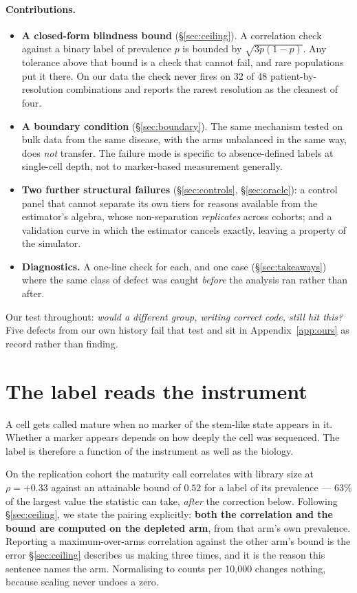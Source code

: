 \documentclass{article}
\begin{document}
\paragraph{Contributions.}
\begin{itemize}
\item \textbf{A closed-form blindness bound} (\S\ref{sec:ceiling}). A correlation
  check against a binary label of prevalence $p$ is bounded by
  $\sqrt{3p(1-p)}$. Any tolerance above that bound is a check that cannot fail,
  and rare populations put it there. On our data the check never fires on 32 of
  48 patient-by-resolution combinations and reports the rarest resolution as the
  cleanest of four.
\item \textbf{A boundary condition} (\S\ref{sec:boundary}). The same mechanism
  tested on bulk data from the same disease, with the arms unbalanced in the same
  way, does \emph{not} transfer. The failure mode is specific to absence-defined
  labels at single-cell depth, not to marker-based measurement generally.
\item \textbf{Two further structural failures} (\S\ref{sec:controls},
  \S\ref{sec:oracle}): a control panel that cannot separate its own tiers for
  reasons available from the estimator's algebra, whose non-separation
  \emph{replicates} across cohorts; and a validation curve in which the estimator
  cancels exactly, leaving a property of the simulator.
\item \textbf{Diagnostics.} A one-line check for each, and one case
  (\S\ref{sec:takeaways}) where the same class of defect was caught
  \emph{before} the analysis ran rather than after.
\end{itemize}

Our test throughout: \emph{would a different group, writing correct code, still
hit this?} Five defects from our own history fail that test and sit in
Appendix~\ref{app:ours} as record rather than finding.

\section{The label reads the instrument}
\label{sec:depth}

A cell gets called mature when no marker of the stem-like state appears in it.
Whether a marker appears depends on how deeply the cell was sequenced. The label
is therefore a function of the instrument as well as the biology.

On the replication cohort the maturity call correlates with library size at
$\rho = +0.33$ against an attainable bound of $0.52$ for a label of its
prevalence --- 63\% of the largest value the statistic can take,
\emph{after} the correction below. Following \S\ref{sec:ceiling}, we state the
pairing explicitly: \textbf{both the correlation and the bound are computed on
the depleted arm}, from that arm's own prevalence. Reporting a
maximum-over-arms correlation against the other arm's bound is the error
\S\ref{sec:ceiling} describes us making three times, and it is the reason this
sentence names the arm. Normalising to counts per 10{,}000 changes nothing,
because scaling never undoes a zero.
\end{document}
